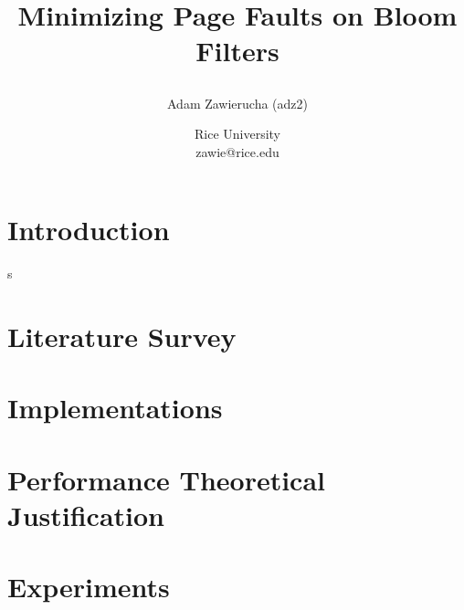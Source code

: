 \documentclass[a4paper]{article}
\title{Minimizing Page Faults on Bloom Filters
\author{Adam Zawierucha (adz2)}

\date{
	Rice University \\ zawie@rice.edu}%
}
\theoremstyle{plain}
\theoremstyle{definition}
\begin{document}
	\maketitle
	
	\begin{abstract}
		
	\end{abstract}
	

	\section{Introduction}
	
s
	\section{Literature Survey}
	

	\section{Implementations}
	

	\section{Performance Theoretical Justification}
	

	\section{Experiments}
	



	
	
\end{document}
